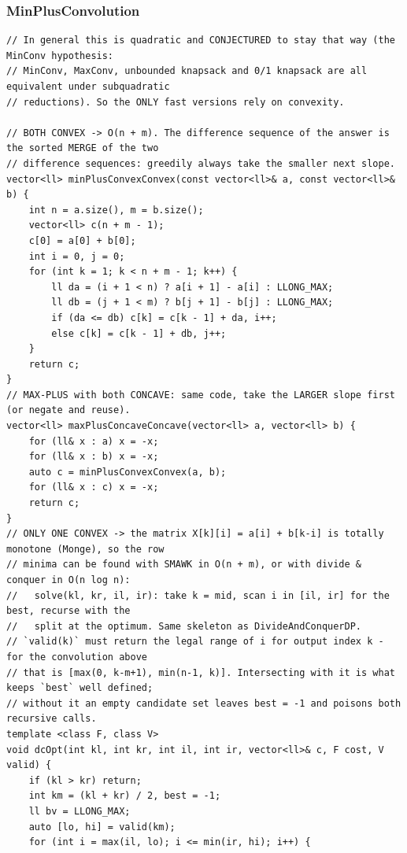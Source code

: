 \documentclass[9pt,a4paper,twocolumn]{extarticle}
\begin{document}
\subsubsection{MinPlusConvolution}
\nopagebreak
\begin{lstlisting}
// In general this is quadratic and CONJECTURED to stay that way (the MinConv hypothesis:
// MinConv, MaxConv, unbounded knapsack and 0/1 knapsack are all equivalent under subquadratic
// reductions). So the ONLY fast versions rely on convexity.

// BOTH CONVEX -> O(n + m). The difference sequence of the answer is the sorted MERGE of the two
// difference sequences: greedily always take the smaller next slope.
vector<ll> minPlusConvexConvex(const vector<ll>& a, const vector<ll>& b) {
    int n = a.size(), m = b.size();
    vector<ll> c(n + m - 1);
    c[0] = a[0] + b[0];
    int i = 0, j = 0;
    for (int k = 1; k < n + m - 1; k++) {
        ll da = (i + 1 < n) ? a[i + 1] - a[i] : LLONG_MAX;
        ll db = (j + 1 < m) ? b[j + 1] - b[j] : LLONG_MAX;
        if (da <= db) c[k] = c[k - 1] + da, i++;
        else c[k] = c[k - 1] + db, j++;
    }
    return c;
}
// MAX-PLUS with both CONCAVE: same code, take the LARGER slope first (or negate and reuse).
vector<ll> maxPlusConcaveConcave(vector<ll> a, vector<ll> b) {
    for (ll& x : a) x = -x;
    for (ll& x : b) x = -x;
    auto c = minPlusConvexConvex(a, b);
    for (ll& x : c) x = -x;
    return c;
}
// ONLY ONE CONVEX -> the matrix X[k][i] = a[i] + b[k-i] is totally monotone (Monge), so the row
// minima can be found with SMAWK in O(n + m), or with divide & conquer in O(n log n):
//   solve(kl, kr, il, ir): take k = mid, scan i in [il, ir] for the best, recurse with the
//   split at the optimum. Same skeleton as DivideAndConquerDP.
// `valid(k)` must return the legal range of i for output index k - for the convolution above
// that is [max(0, k-m+1), min(n-1, k)]. Intersecting with it is what keeps `best` well defined;
// without it an empty candidate set leaves best = -1 and poisons both recursive calls.
template <class F, class V>
void dcOpt(int kl, int kr, int il, int ir, vector<ll>& c, F cost, V valid) {
    if (kl > kr) return;
    int km = (kl + kr) / 2, best = -1;
    ll bv = LLONG_MAX;
    auto [lo, hi] = valid(km);
    for (int i = max(il, lo); i <= min(ir, hi); i++) {

\end{lstlisting}
\end{document}
